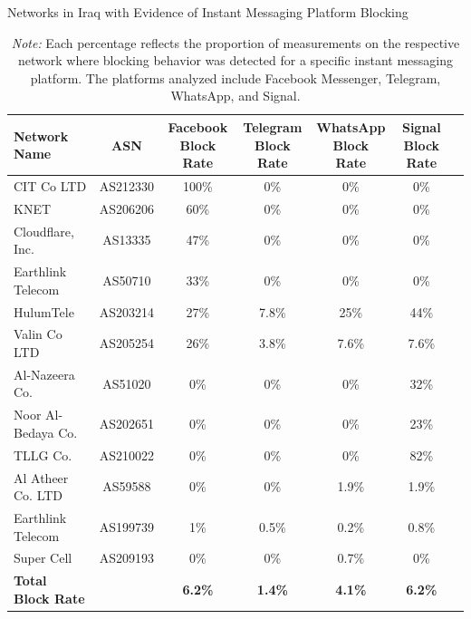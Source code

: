 \begin{table}[H]
\centering
\caption{Networks in Iraq with Evidence of Instant Messaging Platform Blocking}
\begin{tabular}{lcccccc}
\toprule
\textbf{Network Name} & \textbf{ASN} & \shortstack{\textbf{Facebook} \\ \textbf{Block Rate}} & \shortstack{\textbf{Telegram} \\ \textbf{Block Rate}} & \shortstack{\textbf{WhatsApp} \\ \textbf{Block Rate}} & \shortstack{\textbf{Signal} \\ \textbf{Block Rate}} \\
\midrule
CIT Co LTD            & AS212330  & 100\% & 0\%   & 0\%   & 0\%   \\
KNET                  & AS206206  & 60\%  & 0\%   & 0\%   & 0\%   \\
Cloudflare, Inc.      & AS13335   & 47\%  & 0\%   & 0\%   & 0\%   \\
Earthlink Telecom     & AS50710   & 33\%  & 0\%   & 0\%   & 0\%   \\
HulumTele             & AS203214  & 27\%  & 7.8\% & 25\%  & 44\%  \\
Valin Co LTD          & AS205254  & 26\%  & 3.8\% & 7.6\% & 7.6\% \\
Al-Nazeera Co.        & AS51020   & 0\%   & 0\%   & 0\%   & 32\%  \\
Noor Al-Bedaya Co.    & AS202651  & 0\%   & 0\%   & 0\%   & 23\%  \\
TLLG Co.              & AS210022  & 0\%   & 0\%   & 0\%   & 82\%  \\
Al Atheer Co. LTD     & AS59588   & 0\%   & 0\%   & 1.9\% & 1.9\% \\
Earthlink Telecom     & AS199739  & 1\%   & 0.5\% & 0.2\% & 0.8\% \\
Super Cell            & AS209193  & 0\%   & 0\%   & 0.7\% & 0\%   \\
\bottomrule
\textbf{Total Block Rate} & & \textbf{6.2\%} & \textbf{1.4\%} & \textbf{4.1\%} & \textbf{6.2\%} \\
\end{tabular}

\vspace{1em}

\caption*{\textit{Note:} Each percentage reflects the proportion of measurements on the respective network where blocking behavior was detected for a specific instant messaging platform. The platforms analyzed include Facebook Messenger, Telegram, WhatsApp, and Signal.}
\label{tab:im_block_iraq}
\end{table}

